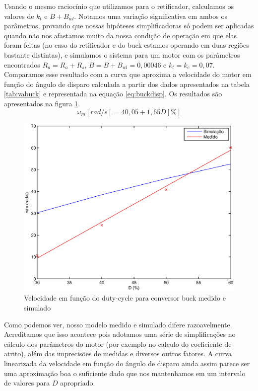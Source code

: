 \documentclass{article}
\begin{document}
Usando o mesmo raciocínio que utilizamos para o retificador, calculamos os valores de $k_t$ e $B + B_{wl}$. Notamos uma variação significativa em ambos os parâmetros, provando que nossas hipóteses simplificadoras só podem ser aplicadas quando não nos afastamos muito da nossa condição de operação em que elas foram feitas (no caso do retificador e do buck estamos operando em duas regiões bastante distintas), e simulamos o sistema para um motor com os parâmetros encontrados $R_a = R_a + R_s$, $B = B + B_{wl} = 0,00046$ e $k_t = k_e = 0,07$.  Comparamos esse resultado com a curva que aproxima a velocidade do motor em função do ângulo de disparo calculada a partir dos dados apresentados na tabela \ref{tab:vabuck} e representada na equação \ref{eq:buckdisp}. Os resultados são apresentados na figura \ref{fig:buckwd}.
\begin{equation}
\omega_m [rad/s] = 40,05 + 1,65 D [\%]
\label{eq:buckdisp}
\end{equation}

\begin{figure} [H]
	\centering
	\includegraphics[width=\linewidth]{Dados/Buck/wd}
	\caption{Velocidade em função do duty-cycle para conversor buck medido e simulado}
	\label{fig:buckwd}
\end{figure}

Como podemos ver, nosso modelo medido e simulado difere razoavelmente. Acreditamos que isso acontece pois adotamos uma série de simplificações no cálculo dos parâmetros do motor (por exemplo no calculo do coeficiente de atrito), além das imprecisões de medidas e diversos outros fatores. A curva linearizada da velocidade em função do ângulo de disparo ainda assim parece ser uma aproximação boa o suficiente dado que nos mantenhamos em um intervalo de valores para $D$ apropriado.
\end{document}
